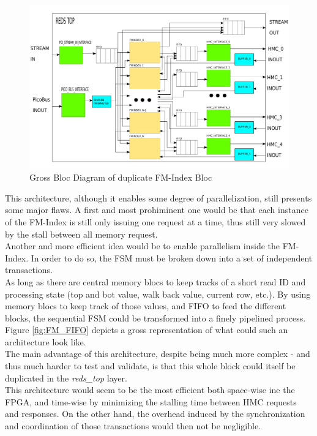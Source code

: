 \begin{figure}[H]
    \centering
    \includegraphics [scale = 0.4]{Figures/FMINDEX_DUPL_DIAG.png}
    \caption{Gross Bloc Diagram of duplicate FM-Index Bloc}
    \label{fig:FM_DUPL}
\end{figure}

This architecture, although it enables some degree of parallelization, still presents some major flaws. A first and most prohiminent one would be that each instance of the FM-Index is still only issuing one request at a time, thus still very slowed by the stall between all memory request. \\


Another and more efficient idea would be to enable parallelism inside the FM-Index. In order to do so, the FSM must be broken down into a set of independent transactions. \\
As long as there are central memory blocs to keep tracks of a short read ID and processing state (top and bot value, walk back value, current row, etc.). By using memory blocs to keep track of those values, and FIFO to feed the different blocks, the sequential FSM could be transformed into a finely pipelined process. Figure \ref{fig:FM_FIFO} depicts a gross representation of what could such an architecture look like. \\

The main advantage of this architecture, despite being much more complex - and thus much harder to test and validate, is that this whole block could itself be duplicated in the \textit{reds\_top} layer. \\

This architecture would seem to be the most efficient both space-wise ine the FPGA, and time-wise by minimizing the stalling time between HMC requests and responses. On the other hand, the overhead induced by the synchronization and coordination of those transactions would then not be negligible.

